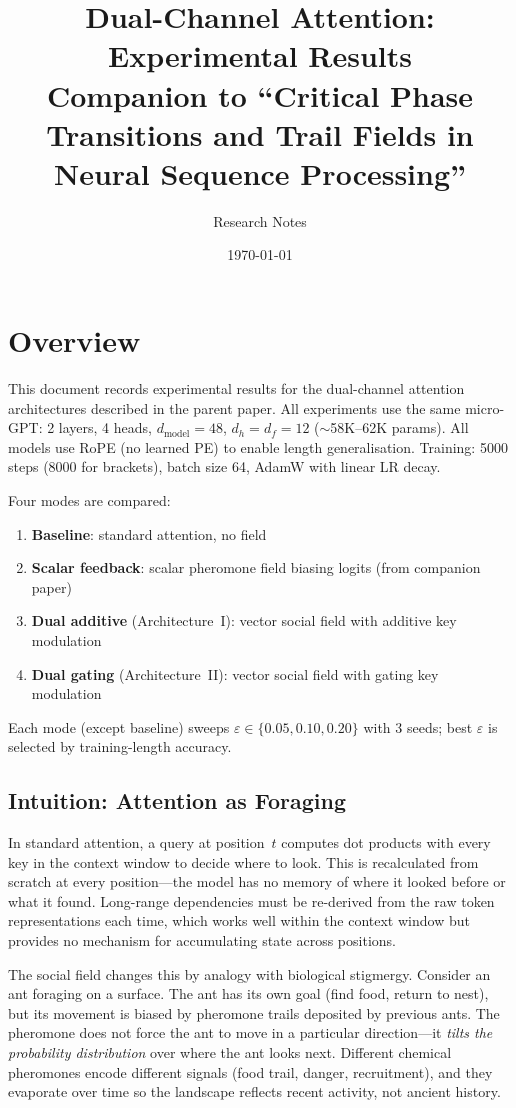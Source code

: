 \documentclass[11pt,a4paper]{article}
\title{Dual-Channel Attention: Experimental Results\\
{\large Companion to ``Critical Phase Transitions and Trail Fields
in Neural Sequence Processing''}}
\author{Research Notes}
\date{\today}
\begin{document}
\maketitle

\section{Overview}

This document records experimental results for the dual-channel
attention architectures described in the parent paper.  All
experiments use the same micro-GPT: 2 layers, 4 heads,
$d_{\text{model}} = 48$, $d_h = d_f = 12$ ($\sim$58K--62K params).
All models use RoPE (no learned PE) to enable length generalisation.
Training: 5000 steps (8000 for brackets), batch size 64,
AdamW with linear LR decay.

Four modes are compared:
\begin{enumerate}
    \item \textbf{Baseline}: standard attention, no field
    \item \textbf{Scalar feedback}: scalar pheromone field biasing
          logits (from companion paper)
    \item \textbf{Dual additive} (Architecture~I): vector social
          field with additive key modulation
    \item \textbf{Dual gating} (Architecture~II): vector social
          field with gating key modulation
\end{enumerate}
Each mode (except baseline) sweeps $\varepsilon \in \{0.05, 0.10,
0.20\}$ with 3 seeds; best $\varepsilon$ is selected by
training-length accuracy.

\subsection{Intuition: Attention as Foraging}

In standard attention, a query at position~$t$ computes dot products
with every key in the context window to decide where to look.  This
is recalculated from scratch at every position---the model has no
memory of where it looked before or what it found.  Long-range
dependencies must be re-derived from the raw token representations
each time, which works well within the context window but provides
no mechanism for accumulating state across positions.

The social field changes this by analogy with biological stigmergy.
Consider an ant foraging on a surface.  The ant has its own goal
(find food, return to nest), but its movement is biased by pheromone
trails deposited by previous ants.  The pheromone does not force the
ant to move in a particular direction---it \emph{tilts the probability
distribution} over where the ant looks next.  Different chemical
pheromones encode different signals (food trail, danger, recruitment),
and they evaporate over time so the landscape reflects recent activity,
not ancient history.
\end{document}
